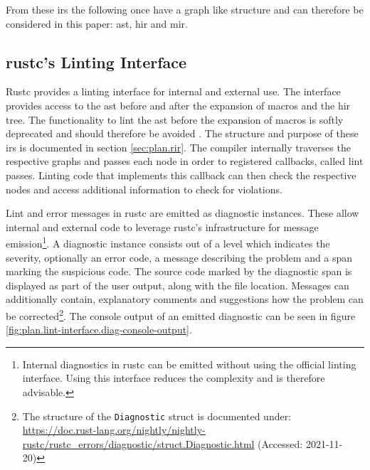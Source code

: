 From these \acrshort{ir}s the following once have a graph like structure and can therefore be considered in this paper: \acrshort{ast}, \acrshort{hir} and \acrshort{mir}.



\subsection{rustc's Linting Interface} \label{sec:plan.linting-api}

Rustc provides a linting interface for internal and external use. The interface provides access to the \acrshort{ast} before and after the expansion of macros and the \acrshort{hir} tree. \cite{rustcdev2021.diagnostic} The functionality to lint the \acrshort{ast} before the expansion of macros is softly deprecated and should therefore be avoided \cite{clippy2020.5518} \cite{rust2020.69838}. The structure and purpose of these \acrshort{ir}s is documented in section \ref{sec:plan.rir}. The compiler internally traverses the respective graphs and passes each node in order to registered callbacks, called lint passes. Linting code that implements this callback can then check the respective nodes and access additional information to check for violations. \cite{rustcdev2021.diagnostic}

Lint and error messages in rustc are emitted as diagnostic instances. These allow internal and external code to leverage rustc's infrastructure for message emission\footnote{Internal diagnostics in rustc can be emitted without using the official linting interface. Using this interface reduces the complexity and is therefore advisable.}. A diagnostic instance consists out of a level which indicates the severity, optionally an error code, a message describing the problem and a span marking the suspicious code. The source code marked by the diagnostic span is displayed as part of the user output, along with the file location. Messages can additionally contain, explanatory comments and suggestions how the problem can be corrected\footnote{The structure of the \texttt{Diagnostic} struct is documented under: \url{https://doc.rust-lang.org/nightly/nightly-rustc/rustc\_errors/diagnostic/struct.Diagnostic.html} (Accessed: 2021-11-20)}. \cite{rustcdev2021.diagnostic} The console output of an emitted diagnostic can be seen in figure \ref{fig:plan.lint-interface.diag-console-output}.

